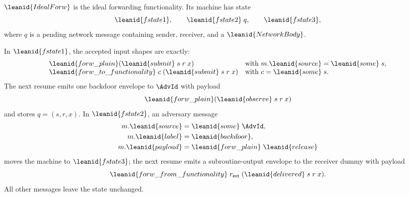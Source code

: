 \begin{definition}
\(\leanid{IdealForw}\) is the ideal forwarding functionality.  Its machine has
state
\[
  \leanid{fstate1},\qquad
  \leanid{fstate2}\;q,\qquad
  \leanid{fstate3},
\]
where \(q\) is a pending network message containing sender, receiver, and a
\(\leanid{NetworkBody}\).

In \(\leanid{fstate1}\), the accepted input shapes are exactly:
\[
\begin{array}{ll}
\leanid{forw\_plain}(\leanid{submit}\;s\;r\;x)
  &\hbox{with }m.\leanid{source}=\leanid{some}\;s,\\
\leanid{forw\_to\_functionality}\;c\;(\leanid{submit}\;s\;r\;x)
  &\hbox{with }c=\leanid{some}\;s .
\end{array}
\]
The next resume emits one backdoor envelope to \(\AdvId\) with payload
\[
  \leanid{forw\_plain}(\leanid{observe}\;s\;r\;x)
\]
and stores \(q=(s,r,x)\).  In \(\leanid{fstate2}\), an adversary message
\[
\begin{aligned}
  m.\leanid{source}&=\leanid{some}\;\AdvId,\\
  m.\leanid{label}&=\leanid{backdoor},\\
  m.\leanid{payload}&=\leanid{forw\_plain}\;\leanid{release}
\end{aligned}
\]
moves the machine to \(\leanid{fstate3}\); the next resume emits a
subroutine-output envelope to the receiver dummy with payload
\[
  \leanid{forw\_from\_functionality}\;r_{\mathsf{ext}}\;
    (\leanid{delivered}\;s\;r\;x).
\]
All other messages leave the state unchanged.
\end{definition}

